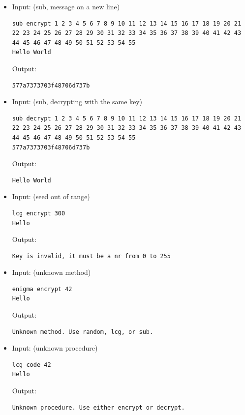 \documentclass[a4paper,10pt]{article}
\begin{document}
\begin{itemize}
\item Input: (sub, message on a new line)
\begin{lstlisting}[style = stdio]
sub encrypt 1 2 3 4 5 6 7 8 9 10 11 12 13 14 15 16 17 18 19 20 21 22 23 24 25 26 27 28 29 30 31 32 33 34 35 36 37 38 39 40 41 42 43 44 45 46 47 48 49 50 51 52 53 54 55
Hello World
\end{lstlisting}
 
  Output:
\begin{lstlisting}[style = stdio]
577a7373703f48706d737b
\end{lstlisting}
 
\item Input: (sub, decrypting with the same key)
\begin{lstlisting}[style = stdio]
sub decrypt 1 2 3 4 5 6 7 8 9 10 11 12 13 14 15 16 17 18 19 20 21 22 23 24 25 26 27 28 29 30 31 32 33 34 35 36 37 38 39 40 41 42 43 44 45 46 47 48 49 50 51 52 53 54 55
577a7373703f48706d737b
\end{lstlisting}
 
  Output:
\begin{lstlisting}[style = stdio]
Hello World
\end{lstlisting}
 
\item Input: (seed out of range)
\begin{lstlisting}[style = stdio]
lcg encrypt 300
Hello
\end{lstlisting}
 
  Output:
\begin{lstlisting}[style = stdio]
Key is invalid, it must be a nr from 0 to 255
\end{lstlisting}
 
\item Input: (unknown method)
\begin{lstlisting}[style = stdio]
enigma encrypt 42
Hello
\end{lstlisting}
 
  Output:
\begin{lstlisting}[style = stdio]
Unknown method. Use random, lcg, or sub.
\end{lstlisting}
 
\item Input: (unknown procedure)
\begin{lstlisting}[style = stdio]
lcg code 42
Hello
\end{lstlisting}
 
  Output:
\begin{lstlisting}[style = stdio]
Unknown procedure. Use either encrypt or decrypt.
\end{lstlisting}
 

\end{itemize}
\end{document}
